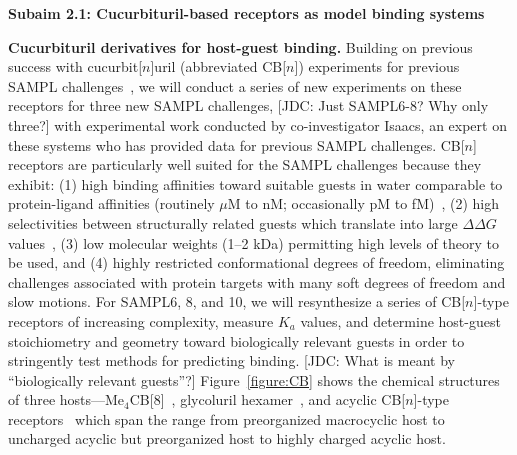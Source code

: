 \documentclass[11pt]{article}
\begin{document}
{\bf Subaim 2.1: Cucurbituril-based receptors as model binding systems}

\textbf{Cucurbituril derivatives for host-guest binding.} 
Building on previous success with cucurbit[$n$]uril (abbreviated CB[$n$]) experiments for previous SAMPL challenges~\cite{ma_acyclic_2012-2, cao_absolute_2014, she_glycoluril-derived_2016}, we will conduct a series of new experiments on these receptors for three new SAMPL challenges,
{\color{red}[JDC: Just SAMPL6-8? Why only three?]}
 with experimental work conducted by co-investigator Isaacs, an expert on these systems who has provided data for previous SAMPL challenges.
CB[$n$] receptors are particularly well suited for the SAMPL challenges because they exhibit: (1) high binding affinities toward suitable guests in water comparable to protein-ligand affinities (routinely $\mu$M to nM; occasionally pM to fM)~\cite{cao_attomolar_2014, liu_cucurbituril_2005, mock_structure_1986, assaf_cucurbiturils:_2015, moghaddam_new_2011, shetty_can_2015, biedermann_release_2012}, (2) high selectivities between structurally related guests which translate into large $\Delta \Delta G$ values~\cite{isaacs_stimuli_2014}, (3) low molecular weights (1--2 kDa) permitting high levels of theory to be used, and (4) highly restricted conformational degrees of freedom, eliminating challenges associated with protein targets with many soft degrees of freedom and slow motions.  
For SAMPL6, 8, and 10, we will resynthesize a series of CB[$n$]-type receptors of increasing complexity, measure $K_a$ values, and determine host-guest stoichiometry and geometry toward biologically relevant guests in order to stringently test methods for predicting binding.  
{\color{red}[JDC: What is meant by ``biologically relevant guests''?]}
Figure~\ref{figure:CB} shows the chemical structures of three hosts---Me$_4$CB[8]~\cite{vinciguerra_synthesis_2015}, glycoluril hexamer~\cite{lucas_templated_2011}, and acyclic CB[$n$]-type receptors~\cite{ma_acyclic_2012, ma_acyclic_2012-1, zhang_acyclic_2014, gilberg_acyclic_2015, sigwalt_acyclic_2016, zhang_acyclic_2014-1} which span the range from preorganized macrocyclic host to uncharged acyclic but preorganized host to highly charged acyclic host.
\end{document}
